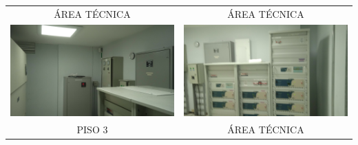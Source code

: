 \documentclass[12pt,a4paper,twoside]{article}
\begin{document}
{\begin{tabular}{ c c }
    ÁREA TÉCNICA & ÁREA TÉCNICA\\
	\includegraphics[width = 7 cm]{Imagenes/23} & \includegraphics[width = 7 cm]{Imagenes/24} \\
    PISO 3 & ÁREA TÉCNICA\\

	
\end{tabular} 

\begin{tabular}{ c c }
	

\end{tabular}}
\end{document}
